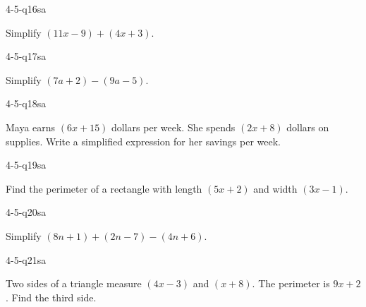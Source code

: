 
\begin{practiceQuestion}{4-5-q16}{sa}
\begin{questionText}
Simplify $(11x - 9) + (4x + 3)$.
\end{questionText}
\end{practiceQuestion}

\begin{practiceQuestion}{4-5-q17}{sa}
\begin{questionText}
Simplify $(7a + 2) - (9a - 5)$.
\end{questionText}
\end{practiceQuestion}

\begin{practiceQuestion}{4-5-q18}{sa}
\begin{questionText}
Maya earns $(6x + 15)$ dollars per week. She spends $(2x + 8)$ dollars on supplies. Write a simplified expression for her savings per week.
\end{questionText}
\end{practiceQuestion}

\begin{practiceQuestion}{4-5-q19}{sa}
\begin{questionText}
Find the perimeter of a rectangle with length $(5x + 2)$ and width $(3x - 1)$.
\end{questionText}
\end{practiceQuestion}

\begin{practiceQuestion}{4-5-q20}{sa}
\begin{questionText}
Simplify $(8n + 1) + (2n - 7) - (4n + 6)$.
\end{questionText}
\end{practiceQuestion}

\begin{practiceQuestion}{4-5-q21}{sa}
\begin{questionText}
Two sides of a triangle measure $(4x - 3)$ and $(x + 8)$. The perimeter is $9x + 2$. Find the third side.
\end{questionText}
\end{practiceQuestion}


